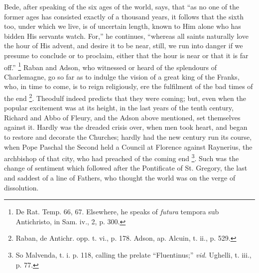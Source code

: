 Bede, after speaking of the six ages of the world, says, that
``as no one of the former ages has consisted exactly of a thousand
years, it follows that the sixth too, under which we live, is of
uncertain length, known to Him alone who has bidden His servants
watch. For,'' he continues, ``whereas all saints naturally
love the hour of His advent, and desire it to be near, still, we run
into danger if we presume to conclude or to proclaim, either that the
hour is near or that it is far off.'' \footnote{De Rat. Temp.
66, 67. Elsewhere, he speaks of \emph{futura} tempora sub Antichristo,
in Sam. iv., 2, p. 300.} Raban and Adson, who witnessed or heard of the splendours of
Charlemagne, go so far as to indulge the vision of a great king of the
Franks, who, in time to come, is to reign religiously, ere the
fulfilment of the bad times of the end \footnote{Raban, de
Antichr. opp. t. vi., p. 178. Adson, ap. Alcuin, t. ii., p. 529.}. Theodulf indeed predicts that they were coming; but, even when
the popular excitement was at its height, in the last years of the
tenth century, Richard and Abbo of Fleury, and the Adson above
mentioned, set themselves against it. Hardly was the dreaded crisis
over, when men took heart, and began to restore and decorate the
Churches; hardly had the new century run its course, when Pope Paschal
the Second held a Council at Florence against Raynerius, the
archbishop of that city, who had preached of the coming end \footnote{So Malvenda, t.
i. p. 118, calling the prelate ``Fluentinus;'' \emph{vid}.
Ughelli, t. iii., p. 77.}. Such was the change of sentiment which followed after the
Pontificate of St. Gregory, the last and saddest of a line of Fathers,
who thought the world was on the verge of dissolution.

